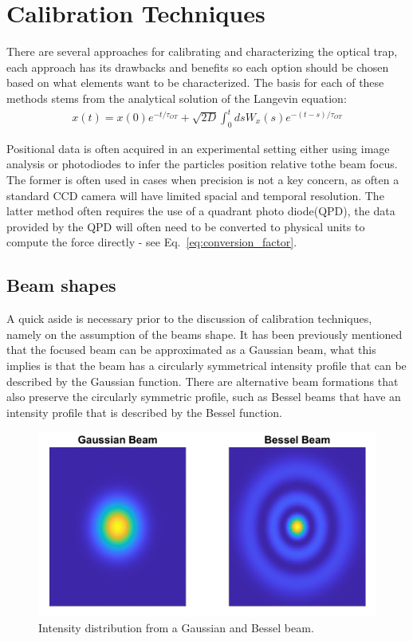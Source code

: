 \section{Calibration Techniques}
\label{sec:calibration_techniques}
There are several approaches for calibrating and characterizing 
the optical trap, each approach has its drawbacks and benefits 
so each option should be chosen based on what elements want to 
be characterized. The basis for each of these methods stems from 
the analytical solution of the Langevin equation:
\begin{align}
	\label{eq:anylitical_lang}
	x(t) = x(0)e^{-t/\tau_{OT}}+\sqrt{2D}\int^t_0dsW_x(s)e^{-(t-s)/\tau_{OT}}
\end{align}

Positional data is often acquired in an experimental setting 
either using image analysis or photodiodes to infer the particles 
position relative tothe beam focus. The former is often used in 
cases when precision is not a key concern, as often a standard 
CCD camera will have limited spacial and temporal resolution. 
The latter method often requires the use of a quadrant photo 
diode(QPD), the data provided by the QPD will often need to be 
converted to physical units to compute the force directly - see Eq.~\eqref{eq:conversion_factor}.

\subsection{Beam shapes}
A quick aside is necessary prior to the discussion 
of calibration techniques, namely on the assumption 
of the beams shape. It has been previously mentioned 
that the focused beam can be approximated as a 
Gaussian beam, what this implies is that the beam has 
a circularly symmetrical intensity profile that can be
described by the Gaussian function. There are alternative 
beam formations that also preserve the circularly 
symmetric profile, such as Bessel beams that have an 
intensity profile that is described by the Bessel 
function. 
\begin{figure}
	\centering
	\includegraphics[width=\linewidth]{Gaussian_Bessel.png}
	\caption{Intensity distribution from a Gaussian and Bessel
	beam.}
\end{figure}

